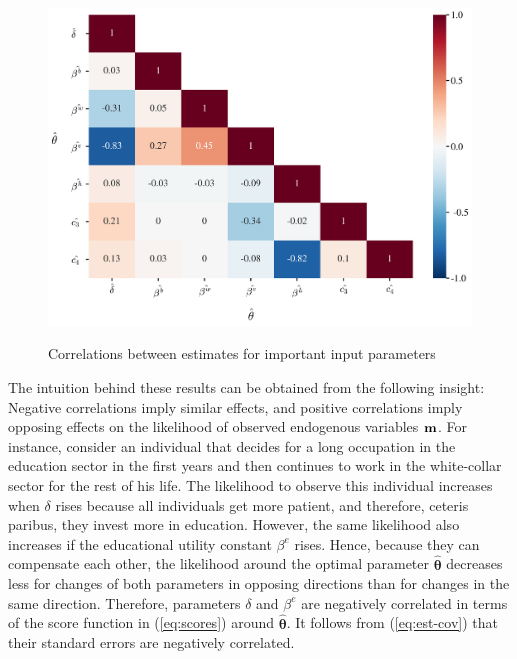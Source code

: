 \begin{figure}[H]
	\caption{Correlations between estimates for important input parameters}
	\centering
	\includegraphics[scale=0.45]{../figures/heatmap_corr_chol}
	\label{fig:corr}
\end{figure}
\noindent
The intuition behind these results can be obtained from the following insight: Negative correlations imply similar effects, and positive correlations imply opposing effects on the likelihood of observed endogenous variables $\bold{m}$. For instance, consider an individual that decides for a long occupation in the education sector in the first years and then continues to work in the white-collar sector for the rest of his life. The likelihood to observe this individual increases when $\delta$ rises because all individuals get more patient, and therefore, ceteris paribus, they invest more in education. However, the same likelihood also increases if the educational utility constant $\beta^e$ rises. Hence, because they can compensate each other, the likelihood around the optimal parameter $\pmb{\hat{\theta}}$ decreases less for changes of both parameters in opposing directions than for changes in the same direction. Therefore, parameters $\delta$ and $\beta^e$ are negatively correlated in terms of the score function in (\ref{eq:scores}) around $\pmb{\hat{\theta}}$. It follows from (\ref{eq:est-cov}) that their standard errors are negatively correlated.

